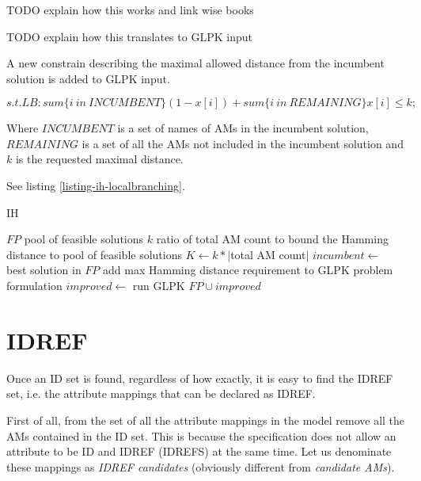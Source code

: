 \subsubsection{}

TODO explain how this works and link wise books

TODO explain how this translates to GLPK input

A new constrain describing the maximal allowed distance from the incumbent solution is added to GLPK input.

\[s.t. LB: sum\{i\ in\ INCUMBENT\} (1 - x[i]) + sum\{i\ in\ REMAINING\} x[i] \leq k;\]

Where $INCUMBENT$ is a set of names of AMs in the incumbent solution, $REMAINING$ is a set of all the AMs not included in the incumbent solution and $k$ is the requested maximal distance.

See listing \ref{listing-ih-localbranching}.

\begin{algorithm}
\caption{ IH}
\label{listing-ih-localbranching}
\begin{algorithmic}
\REQUIRE $FP$ pool of feasible solutions
\REQUIRE $k$ ratio of total AM count to bound the Hamming distance to
\ENSURE pool of feasible solutions
\STATE $K \gets k * |$total AM count$|$
\STATE $incumbent \gets $ best solution in $FP$ 
\STATE add max Hamming distance requirement to GLPK problem formulation
\STATE $improved \gets $ run GLPK
\RETURN $FP \cup improved$
\end{algorithmic}
\end{algorithm}

\section{IDREF}

Once an ID set is found, regardless of how exactly, it is easy to find the IDREF set, i.e. the attribute mappings that can be declared as IDREF. %

First of all, from the set of all the attribute mappings in the model remove all the AMs contained in the ID set. This is because the specification %
does not allow an attribute to be ID and IDREF (IDREFS) at the same time. Let us denominate these mappings as \textit{IDREF candidates} (obviously different from \textit{candidate AMs}). %

